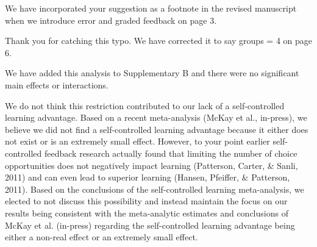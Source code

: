 \documentclass[final]{article}
\newcommand{\TaskEstimationBox}[2]{%
\ifoptiondraft{\parbox{1.0\linewidth}{\hfill \hfill {\colorbox{#2}{\color{White} \textbf{#1}}}}}%
{}%
}
\def\Done {\TaskEstimationBox{Done}{Blue}}
\begin{document}

We have incorporated your suggestion as a footnote in the revised manuscript when we introduce error and graded feedback on page 3.

\Done


Thank you for catching this typo. We have corrected it to say groups = 4 on page 6.

\Done


We have added this analysis to Supplementary B and there were no significant main effects or interactions.

\Done


We do not think this restriction contributed to our lack of a self-controlled learning advantage. Based on a recent meta-analysis (McKay et al., in-press), we believe we did not find a self-controlled learning advantage because it either does not exist or is an extremely small effect. However, to your point earlier self-controlled feedback research actually found that limiting the number of choice opportunities does not negatively impact learning (Patterson, Carter, \& Sanli, 2011) and can even lead to superior learning (Hansen, Pfeiffer, \& Patterson, 2011). Based on the conclusions of the self-controlled learning meta-analysis, we elected to not discuss this possibility and instead maintain the focus on our results being consistent with the meta-analytic estimates and conclusions of McKay et al. (in-press) regarding the self-controlled learning advantage being either a non-real effect or an extremely small effect.
\end{document}
